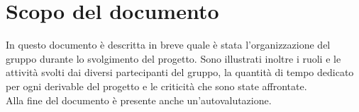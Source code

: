 \section*{Scopo del documento}
In questo documento è descritta in breve quale è stata l'organizzazione del gruppo durante lo svolgimento del progetto. Sono illustrati inoltre i ruoli e le attività svolti dai diversi partecipanti del gruppo, la quantità di tempo dedicato per ogni derivable del progetto e le criticità che sono state affrontate. \\
Alla fine del documento è presente anche un'autovalutazione.